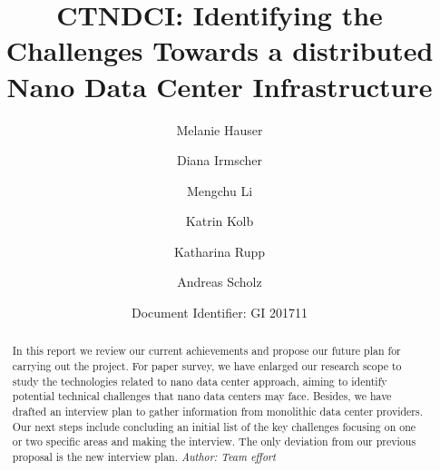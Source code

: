 \documentclass[sigchi-a, authorversion]{acmart}
\begin{document}
\title{CTNDCI: Identifying the Challenges Towards a distributed Nano Data Center Infrastructure}

\author{Melanie Hauser}

\author{Diana Irmscher} 

\author{Mengchu Li}

\author{Katrin Kolb}

\author{Katharina Rupp}

\author{Andreas Scholz}



\author{Document Identifier: GI 201711}
\renewcommand{\shortauthors}{Katrin Kolb et al.}

\begin{abstract}  %
In this report we review our current achievements and propose our future plan for carrying out the project. 
For paper survey, we have enlarged our research scope to study the technologies related to nano data center approach, 
aiming to identify potential technical challenges that nano data centers may face. 
Besides, we have drafted an interview plan to gather information from monolithic data center providers. 
Our next steps include concluding an initial list of the key challenges focusing on one or two specific areas and making the interview. 
The only deviation from our previous proposal is the new interview plan.
\textit{Author: Team effort}\\
\end{abstract}


\maketitle
\end{document}

